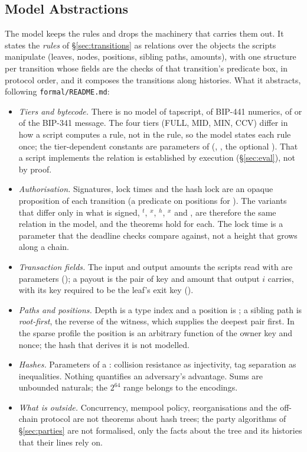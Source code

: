 \subsection{Model Abstractions}\label{app:lean-abs}

The model keeps the rules and drops the machinery that carries them out. It
states the \emph{rules} of \S\ref{sec:transitions} as relations over the
objects the scripts manipulate (leaves, nodes, positions, sibling paths,
amounts), with one structure per transition whose fields are the checks of
that transition's predicate box, in protocol order, and it composes the
transitions along histories. What it abstracts, following
\texttt{formal/README.md}:

\begin{itemize}
\item \emph{Tiers and bytecode.} There is no model of tapscript, of
BIP-441 numerics, of  or of the BIP-341 message. The four tiers
(FULL, MID, MIN, CCV) differ in how a script computes a rule, not in the
rule, so the model states each rule once; the tier-dependent constants
are parameters of  (, , the
optional ). That a script implements the relation is
established by execution (\S\ref{sec:eval}), not by proof.
\item \emph{Authorisation.} Signatures, lock times and the hash lock are
an opaque proposition  of each transition (a predicate on
positions for ). The variants that differ only in what is
signed, $^{t}$, $^{x}$, $^{h}$,
$^{x}$ and , are therefore the same relation in the
model, and the theorems hold for each. The lock time is a parameter that
the deadline checks compare against, not a height that grows along a
chain.
\item \emph{Transaction fields.} The input and output amounts the scripts
read with  are parameters (); a payout is the pair of
key and amount that output $i$ carries, with its key required to be the
leaf's exit key ().
\item \emph{Paths and positions.} Depth is a type index and a position is
; a sibling path is \emph{root-first}, the reverse of the
witness, which supplies the deepest pair first. In the sparse profile the
position is an arbitrary function of the owner key and nonce; the hash
that derives it is not modelled.
\item \emph{Hashes.} Parameters of a : collision
resistance as injectivity, tag separation as inequalities. Nothing
quantifies an adversary's advantage. Sums are unbounded naturals; the
$2^{64}$ range belongs to the encodings.
\item \emph{What is outside.} Concurrency, mempool policy,
reorganisations and the off-chain protocol are not theorems about hash
trees; the party algorithms of \S\ref{sec:parties} are not formalised,
only the facts about the tree and its histories that their lines rely on.
\end{itemize}

